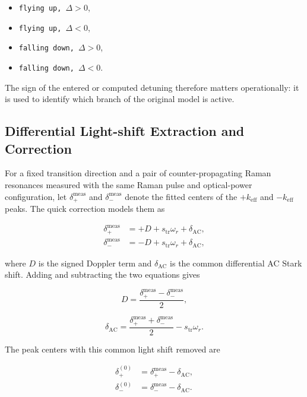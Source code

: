 \documentclass[11pt,a4paper]{article}
\begin{document}
\begin{itemize}
  \item \texttt{flying up, $\Delta>0$},
  \item \texttt{flying up, $\Delta<0$},
  \item \texttt{falling down, $\Delta>0$},
  \item \texttt{falling down, $\Delta<0$}.
\end{itemize}

The sign of the entered or computed detuning therefore matters operationally: it is used to
identify which branch of the original model is active.

\subsection{Differential Light-shift Extraction and Correction}

For a fixed transition direction and a pair of counter-propagating Raman resonances measured with
the same Raman pulse and optical-power configuration, let
$\delta_{+}^{\mathrm{meas}}$ and $\delta_{-}^{\mathrm{meas}}$ denote the fitted centers of the
$+k_{\mathrm{eff}}$ and $-k_{\mathrm{eff}}$ peaks. The quick correction models them as

\begin{align}
\delta_{+}^{\mathrm{meas}} &= +D + s_{\mathrm{tr}}\omega_r + \delta_{\mathrm{AC}}, \\
\delta_{-}^{\mathrm{meas}} &= -D + s_{\mathrm{tr}}\omega_r + \delta_{\mathrm{AC}},
\end{align}

where $D$ is the signed Doppler term and $\delta_{\mathrm{AC}}$ is the common differential
AC Stark shift. Adding and subtracting the two equations gives

\begin{equation}
D = \frac{\delta_{+}^{\mathrm{meas}}-\delta_{-}^{\mathrm{meas}}}{2},
\end{equation}

\begin{equation}
\delta_{\mathrm{AC}}
= \frac{\delta_{+}^{\mathrm{meas}}+\delta_{-}^{\mathrm{meas}}}{2}
-s_{\mathrm{tr}}\omega_r.
\end{equation}

The peak centers with this common light shift removed are

\begin{align}
\delta_{+}^{(0)} &= \delta_{+}^{\mathrm{meas}}-\delta_{\mathrm{AC}}, \\
\delta_{-}^{(0)} &= \delta_{-}^{\mathrm{meas}}-\delta_{\mathrm{AC}}.
\end{align}
\end{document}
